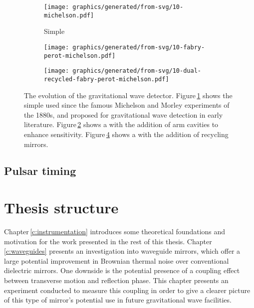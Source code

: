 
\begin{figure}
  \begin{center}
    \begin{subfigure}{.3\textwidth}
      \texttt{[image: graphics/generated/from-svg/10-michelson.pdf]}
      \caption{Simple \MI{}}
      \label{fig:mi}
    \end{subfigure}
    \hfill
    \begin{subfigure}{.3\textwidth}
      \texttt{[image: graphics/generated/from-svg/10-fabry-perot-michelson.pdf]}
      \caption{\FPMI{}}
      \label{fig:fpmi}
    \end{subfigure}
    \hfill
    \begin{subfigure}{.3\textwidth}
      \texttt{[image: graphics/generated/from-svg/10-dual-recycled-fabry-perot-michelson.pdf]}
      \caption{\DRFPMI{}}
      \label{fig:drfpmi}
    \end{subfigure}
    \caption[The evolution of the gravitational wave detector]{The evolution of the gravitational wave detector. Figure\,\ref{fig:mi} shows the simple \MI{} used since the famous Michelson and Morley experiments of the 1880s, and proposed for gravitational wave detection in early literature. Figure\,\ref{fig:fpmi} shows a \MI{} with the addition of \FP{} arm cavities to enhance sensitivity. Figure\,\ref{fig:drfpmi} shows a \FPMI{} with the addition of recycling mirrors.}
  \end{center}
\end{figure}

\subsection{Pulsar timing}

\section{Thesis structure}
Chapter\,\ref{c:instrumentation} introduces some theoretical foundations and motivation for the work presented in the rest of this thesis. Chapter\,\ref{c:waveguides} presents an investigation into waveguide mirrors, which offer a large potential improvement in Brownian thermal noise over conventional dielectric mirrors. One downside is the potential presence of a coupling effect between transverse motion and reflection phase. This chapter presents an experiment conducted to measure this coupling in order to give a clearer picture of this type of mirror's potential use in future gravitational wave facilities.

